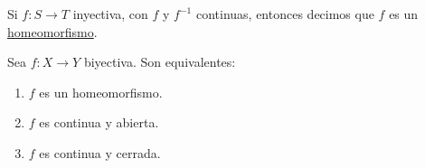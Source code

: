 \begin{defn}
    Si $f: S \rightarrow T$ inyectiva, con $f$ y $f^{-1}$ continuas, entonces decimos que $f$ es un \ul{homeomorfismo}.
\end{defn}

\begin{teo}
    Sea $f: X \rightarrow Y$ biyectiva. Son equivalentes:
    
    \begin{enumerate}
        \item $f$ es un homeomorfismo.
        \item $f$ es continua y abierta.
        \item $f$ es continua y cerrada.
    \end{enumerate}
\end{teo}